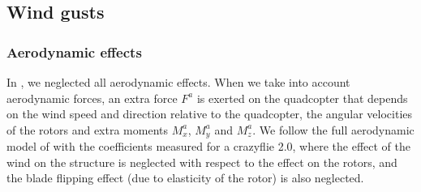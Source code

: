 \documentclass[anonymous=true,format=sigconf, screen=true, review=false]{acmart}
\begin{document}




\subsection{Wind gusts}

\subsubsection{Aerodynamic effects}
\label{sec:aero}

In , we neglected all aerodynamic effects. %
When we take into account aerodynamic forces, an extra force $F^a$ is exerted on the quadcopter that depends on the wind speed and direction relative to the quadcopter, the angular velocities of the rotors and extra moments $M^a_x$, $M^a_y$ and $M^a_z$. We follow the full aerodynamic model of \cite{nanoquadcop} with the coefficients measured for a crazyflie 2.0, where the effect of the wind on the structure is neglected with respect to the effect on the rotors, and the blade flipping effect (due to elasticity of the rotor) is also neglected. %
\end{document}

